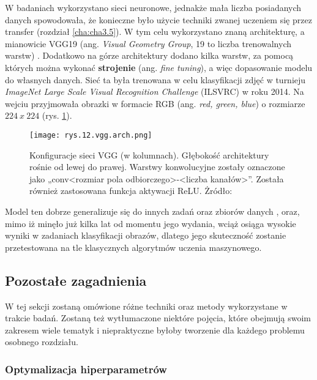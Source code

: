 W badaniach wykorzystano sieci neuronowe, jednakże mała liczba posiadanych danych spowodowała, że konieczne było użycie techniki zwanej uczeniem się przez transfer (rozdział \ref{cha:cha3.5}). W tym celu wykorzystano znaną architekturę, a mianowicie VGG19 (ang. \textit{Visual Geometry Group}, 19 to liczba trenowalnych warstw) \cite{Simonyan15}. Dodatkowo na górze architektury dodano kilka warstw, za pomocą których można wykonać \textbf{strojenie} (ang. \textit{fine tuning}), a więc dopasowanie modelu do własnych danych. Sieć ta była trenowana w celu klasyfikacji zdjęć w turnieju \textit{ImageNet Large Scale Visual Recognition Challenge} (ILSVRC) w roku 2014. Na wejciu przyjmowała obrazki w formacie RGB (ang. \textit{red, green, blue}) o rozmiarze $224~x~224$ (rys. \ref{fig:mesh12}). 
\begin{figure}[h]
    \centering
    \texttt{[image: rys.12.vgg.arch.png]}
    \caption{Konfiguracje sieci VGG (w kolumnach). Głębokość architektury rośnie od lewej do prawej. Warstwy konwolucyjne zostały oznaczone jako „conv<rozmiar pola odbiorczego>-<liczba kanałów>”. Została również zastosowana funkcja aktywacji ReLU. Żródło: \cite{Simonyan15}}
    \label{fig:mesh12}
\end{figure}
Model ten dobrze generalizuje się do innych zadań oraz zbiorów danych \cite{Simonyan15}, oraz, mimo iż minęło już kilka lat od momentu jego wydania, wciąż osiąga wysokie wyniki w zadaniach klasyfikacji obrazów, dlatego jego skuteczność zostanie przetestowana na tle klasycznych algorytmów uczenia maszynowego. 

\subsection{Pozostałe zagadnienia}
\label{Pozostałe zagadnienia}

W tej sekcji zostaną omówione różne techniki oraz metody wykorzystane w trakcie badań. Zostaną też wytłumaczone niektóre pojęcia, które obejmują swoim zakresem wiele tematyk i niepraktyczne byłoby tworzenie dla każdego problemu osobnego rozdziału.



\subsubsection{Optymalizacja hiperparametrów}
\label{Optymalizacja hiperparametrów}

